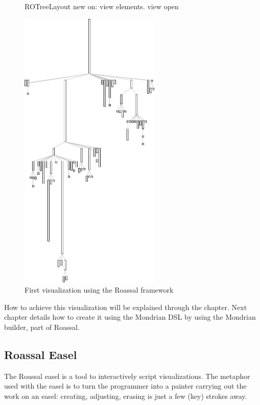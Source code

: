 \documentclass[a4paper,10pt,twoside]{book}
\begin{document}
\begin{figure}[H]
\begin{minipage}[t]{0.5\textwidth}
\begin{code}{}
ROTreeLayout new on: view elements.
view open
\end{code}
   \end{minipage}
   \hfill
   \begin{minipage}[t]{0.6\textwidth}
      \vspace{0pt} \raggedright
       \centering
		\includegraphics[width=0.6\textwidth]{collectionHierarchy}
   \end{minipage}
\label{fig:firstVisualization}
\caption{First visualization using the Roassal framework}
\end{figure}

How to achieve this visualization will be explained through the chapter. 
Next chapter details how to create it using the Mondrian DSL by using the Mondrian builder, part of Roassal.

\subsection{Roassal Easel}

The Roassal easel is a tool to interactively script visualizations. The metaphor used with the easel is to turn the programmer into a painter carrying out the work on an easel: creating, adjusting, erasing is just a few (key) strokes away.
\end{document}
